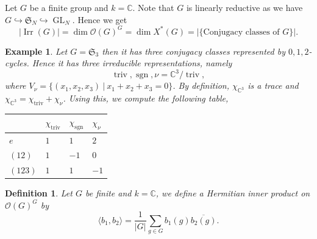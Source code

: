 \documentclass[10pt]{article}
\newtheorem{definition}{Definition}[section]
\newtheorem{example}{Example}[section]
\numberwithin{equation}{theorem}
\DeclareMathOperator{\triv}{triv}
\DeclareMathOperator{\Irr}{Irr}
\DeclareMathOperator{\GL}{GL}
\DeclareMathOperator{\sgn}{sgn}
\newcommand{\Ouv}[0]{\mathcal{O}}
\newcommand{\C}[0]{\mathbb{C}}
\newcommand{\sep}[0]{\:|\:}
\begin{document}
Let $G$ be a finite group and $k=\C$. Note that $G$ is linearly reductive as we have $G\hookrightarrow\mathfrak{S}_N\hookrightarrow\GL_N$.
Hence we get 
\begin{equation*}
  \vert\Irr(G)\vert = \dim\Ouv(G)^G = \dim X^*(G) = \vert\{\text{Conjugacy classes of $G$}\}\vert.
\end{equation*}
\begin{example}
  Let $G=\mathfrak{S}_3$ then it has three conjugacy classes represented by $0,1,2$-cycles. Hence it has three irreducible representations, namely
  \begin{equation*}
    \triv,\sgn,\nu=\C^3/\triv,
  \end{equation*}
  where $V_\nu = \{(x_1,x_2,x_3)\sep x_1+x_2+x_3 = 0\}$. By definition, $\chi_{\C^3}$ is a trace and $\chi_{\C^3} = \chi_{\triv}+\chi_\nu$. Using this, we compute the following table,
  \begin{center}
\centering
\begin{tabular}{l|l|l|l}
        & $\chi_{\triv}$ & $\chi_{\sgn}$ & $\chi_\nu$ \\ \hline
$e$     & $1$            & $1$           & $2$        \\ \hline
$(12)$  & $1$            & $-1$          & $0$        \\ \hline
$(123)$ & $1$            & $1$           & $-1$      
\end{tabular}
\end{center}
\end{example}
\begin{definition}
  Let $G$ be finite and $k=\C$, we define a Hermitian inner product on $\Ouv(G)^G$ by 
\begin{equation*}
  \langle b_1,b_2\rangle = {\frac 1 {\vert G\vert}}\sum_{g\in G}b_1(g)\overline{b_2(g)}.
\end{equation*}
\end{definition}
\end{document}
